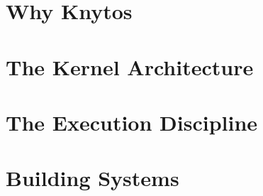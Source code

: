 \documentclass{techdoc}
\begin{document}

    \part{Why Knytos}

    
    \newpage

    
    \newpage

    


    \part{The Kernel Architecture}

    
    \newpage

    
    \newpage

    
    \newpage

    


    \part{The Execution Discipline}

    
    \newpage

    
    \newpage

    


    \part{Building Systems}
\end{document}
